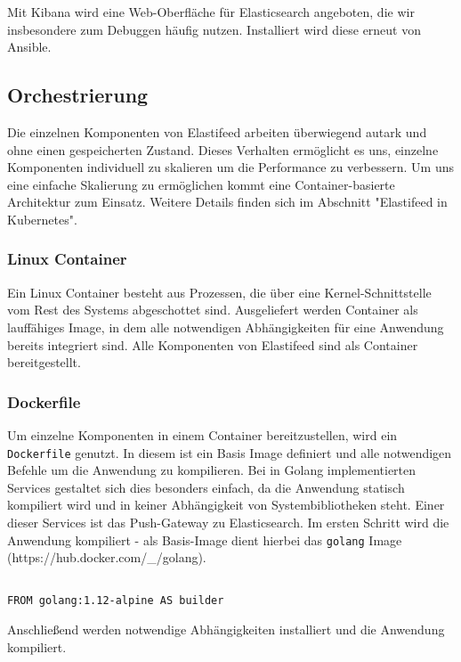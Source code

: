 Mit Kibana wird eine Web-Oberfläche für Elasticsearch angeboten, die wir insbesondere zum Debuggen häufig nutzen. Installiert wird diese erneut von Ansible.

\subsection{Orchestrierung}
Die einzelnen Komponenten von Elastifeed arbeiten überwiegend autark und ohne einen gespeicherten Zustand.
Dieses Verhalten ermöglicht es uns, einzelne Komponenten individuell zu skalieren um die Performance zu verbessern.
Um uns eine einfache Skalierung zu ermöglichen kommt eine Container-basierte Architektur zum Einsatz.
Weitere Details finden sich im Abschnitt "Elastifeed in Kubernetes".

\subsubsection{Linux Container}
Ein Linux Container besteht aus Prozessen, die über eine Kernel-Schnittstelle vom Rest des Systems abgeschottet sind. Ausgeliefert werden Container als lauffähiges Image, in dem alle notwendigen Abhängigkeiten für eine Anwendung bereits integriert sind.
Alle Komponenten von Elastifeed sind als Container bereitgestellt.

\subsubsection{Dockerfile}

Um einzelne Komponenten in einem Container bereitzustellen, wird ein \texttt{Dockerfile} genutzt.
In diesem ist ein Basis Image definiert und alle notwendigen Befehle um die Anwendung zu kompilieren.
Bei in Golang implementierten Services gestaltet sich dies besonders einfach, da die Anwendung statisch kompiliert wird und in keiner Abhängigkeit von Systembibliotheken steht.
Einer dieser Services ist das Push-Gateway zu Elasticsearch.
Im ersten Schritt wird die Anwendung kompiliert - als Basis-Image dient hierbei das \texttt{golang} Image (https://hub.docker.com/\_/golang).

\begin{lstlisting}

FROM golang:1.12-alpine AS builder

\end{lstlisting}

Anschließend werden notwendige Abhängigkeiten installiert und die Anwendung kompiliert.

